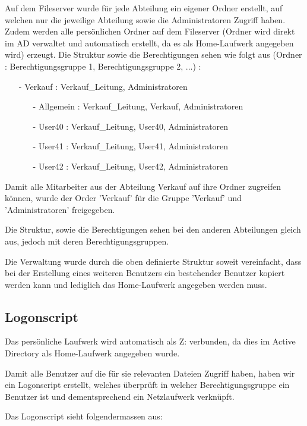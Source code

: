 \documentclass[11pt,a4paper,parskip=half]{scrartcl}
\begin{document}
Auf dem Fileserver wurde für jede Abteilung ein eigener Ordner erstellt, auf welchen nur die jeweilige Abteilung sowie die Administratoren Zugriff haben. Zudem werden alle persönlichen Ordner auf dem Fileserver (Ordner wird direkt im AD verwaltet und automatisch erstellt, da es als Home-Laufwerk angegeben wird) erzeugt. Die Struktur sowie die Berechtigungen sehen wie folgt aus (Ordner : Berechtigungsgruppe 1, Berechtigungsgruppe 2, ...) :
\begin{itemize}
\item[-]{Verkauf : Verkauf\_Leitung, Administratoren}
\begin{itemize}
\item[-]{Allgemein : Verkauf\_Leitung, Verkauf, Administratoren}
\item[-]{User40 : Verkauf\_Leitung, User40, Administratoren}
\item[-]{User41 : Verkauf\_Leitung, User41, Administratoren}
\item[-]{User42 : Verkauf\_Leitung, User42, Administratoren}
\end{itemize}
\end{itemize}
Damit alle Mitarbeiter aus der Abteilung Verkauf auf ihre Ordner zugreifen können, wurde der Order 'Verkauf' für die Gruppe 'Verkauf' und 'Administratoren' freigegeben.

Die Struktur, sowie die Berechtigungen sehen bei den anderen Abteilungen gleich aus, jedoch mit deren Berechtigungsgruppen.

Die Verwaltung wurde durch die oben definierte Struktur soweit vereinfacht, dass bei der Erstellung eines weiteren Benutzers ein bestehender Benutzer kopiert werden kann und lediglich das Home-Laufwerk angegeben werden muss.
\subsection{Logonscript}
Das persönliche Laufwerk wird automatisch als Z: verbunden, da dies im Active Directory als Home-Laufwerk angegeben wurde.

Damit alle Benutzer auf die für sie relevanten Dateien Zugriff haben, haben wir ein Logonscript erstellt, welches überprüft in welcher Berechtigungsgruppe ein Benutzer ist und dementsprechend ein Netzlaufwerk verknüpft.

Das Logonscript sieht folgendermassen aus:

\end{document}
